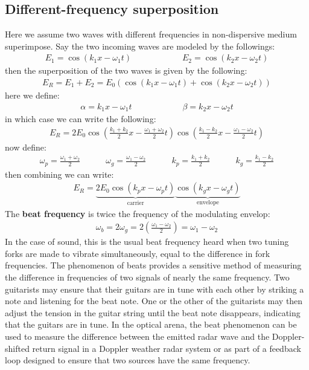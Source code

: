 \documentclass[11pt]{book}
\theoremstyle{break}
\theoremstyle{break}
\begin{document}
\subsection{Different-frequency superposition}
Here we assume two waves with different frequencies in non-dispersive medium superimpose. Say the two incoming waves are modeled by the followings:
\begin{align*}
E_1 = \cos(k_1 x - \omega_1t) \qquad\qquad\qquad E_2 = \cos(k_2 x - \omega_2t)
\end{align*}
then the superposition of the two waves is given by the following:
\begin{align*}
E_R = E_1 + E_2 = E_0 \left( \cos(k_1 x - \omega_1 t) + \cos(k_2 x - \omega_2 t)\right)
\end{align*}
here we define:
\begin{align*}
\alpha = k_1 x - \omega_1 t \qquad\qquad\qquad \beta = k_2 x - \omega_2 t
\end{align*}
in which case we can write the following:
\begin{align*}
E_R = 2E_0 \cos\left( \frac{k_1 + k_2}{2}x - \frac{\omega_1 + \omega_2}{2}t\right) \cos\left( \frac{k_1 - k_2}{2}x - \frac{\omega_1 - \omega_2}{2}t\right)
\end{align*}
now define:
\begin{align*}
\omega_p = \frac{\omega_1 + \omega_2}{2} \qquad\quad \omega_g = \frac{\omega_1 - \omega_2}{2} \qquad\quad k_p = \frac{k_1+k_2}{2}\qquad\quad k_g = \frac{k_1 - k_2}{2}
\end{align*}
then combining we can write:
\begin{align}
E_R = \underbrace{2E_0 \cos(k_p x - \omega_p t)}_{\text{carrier}} \underbrace{\cos( k_g x - \omega_g t)}_{\text{envelope}}
\end{align}
The \textbf{beat frequency} is twice the frequency of the modulating envelop:
\begin{align*}
\omega_b = 2\omega_g = 2\left( \frac{\omega_1 - \omega_2}{2}\right) = \omega_1 - \omega_2
\end{align*}
In the case of sound, this is the usual beat frequency heard when two tuning forks are made to vibrate simultaneously, equal to the difference in fork frequencies. The phenomenon of beats provides a sensitive method of measuring the difference in frequencies of two signals of nearly the same frequency. Two guitarists may ensure that their guitars are in tune with each other by striking a note and listening for the beat note. One or the other of the guitarists may then adjust the tension in the guitar string until the beat note disappears, indicating that the guitars are in tune. In the optical arena, the beat phenomenon can be used to measure the difference between the emitted radar wave and the Doppler-shifted return signal in a Doppler weather radar system or as part of a feedback loop designed to ensure that two sources have the same
frequency. 
\end{document}
